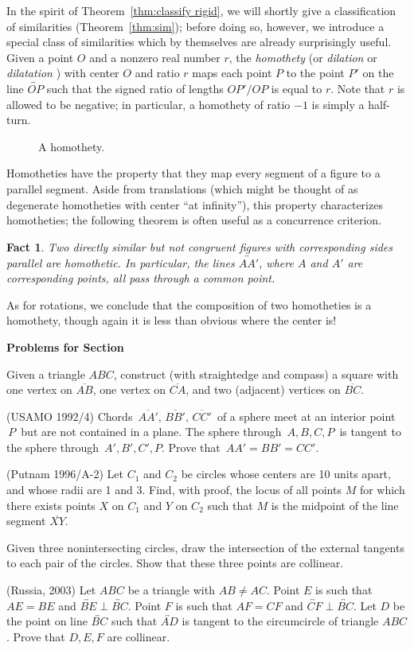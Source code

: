 \documentclass[12pt]{book}
\newcounter{exc}
\numberwithin{exc}{section}
\numberwithin{figure}{section}
\newenvironment{exer}{\vspace{0.1in}
\noindent \textbf{Problems for Section~\thesection} \vspace{0.1in}
\begin{list}{\arabic{exc}.}{\usecounter{exc}}}{\end{list}}
\newtheorem{fact}[theorem]{Fact}
\numberwithin{equation}{theorem}
\def\ii{\item}
\def\line#1{\overleftrightarrow{#1}}
\def\seg#1{\overline{#1}}
\begin{document}
In the spirit of Theorem~\ref{thm:classify rigid}, we will shortly
give a classification of similarities (Theorem~\ref{thm:sim}); before
doing so, however, we introduce a special class of similarities which by themselves are already surprisingly useful.
Given a point $O$ and a nonzero real number $r$, the \emph{homothety} 
 (or \emph{dilation} 
or \emph{dilatation} )
with center $O$ and ratio $r$ maps each point $P$  to the point 
$P'$ on the line $\line{OP}$ such that the signed ratio of lengths
$OP'/OP$ is equal to $r$. Note that $r$ is allowed to be negative; in
particular, a homothety of ratio $-1$ is simply a
half-turn. 
\begin{figure}[ht]
\caption{A homothety.}
\end{figure}

Homotheties have the property that they map every segment of a figure to 
a parallel segment. Aside from translations (which might be thought of 
as degenerate homotheties with center ``at infinity''), this property 
characterizes homotheties; the following theorem is often useful as a 
concurrence criterion. 
\begin{fact}
Two directly similar but not congruent figures with corresponding sides parallel 
are homothetic. In particular, the lines $\line{AA'}$, where $A$ and $A'$ are 
corresponding points, all pass through a common point.
\end{fact}
As for rotations, we conclude that the composition of two homotheties 
is a homothety, though again it is less than obvious where the 
center is!

\begin{exer}
\ii
Given a triangle $ABC$, construct (with straightedge and compass)
a square with one vertex on $\seg{AB}$, 
one vertex on $\seg{CA}$, and two (adjacent) vertices on $\seg{BC}$.
\ii
(USAMO 1992/4)
Chords $\, \overline{AA'}, \, \overline{BB'}, \, \overline{CC'} 
\,$ of a sphere meet at an interior point $\, P \,$ but are not 
contained in a plane.  The sphere through $\, A,B,C,P \,$ 
is tangent to the sphere through $\, A', B', C', P$. 
Prove that $\, AA' = BB' = CC'$. 
\ii
(Putnam 1996/A-2)
Let $C_1$ and $C_2$ be circles whose centers are 10 units apart, and
whose radii are 1 and 3. Find, with proof, the locus of all points $M$
for which there exists points $X$ on $C_1$ and $Y$ on $C_2$ such that
$M$ is the midpoint of the line segment $\seg{XY}$.
\ii
Given three nonintersecting circles, draw the intersection of the 
external tangents to each pair of the circles. Show that these three 
points are collinear.
\ii
(Russia, 2003) \label{ex:rus03homot}
Let $ABC$ be a triangle with $AB \neq AC$. Point $E$ is such that
$AE = BE$ and $\line{BE} \perp \line{BC}$. Point $F$ is such that $AF = CF$ and
$\line{CF} \perp \line{BC}$. Let $D$ be the point on line $\line{BC}$ such that
$\line{AD}$ is tangent to the circumcircle of triangle $ABC$. Prove that
$D,E,F$ are collinear.
\end{exer}
\end{document}
